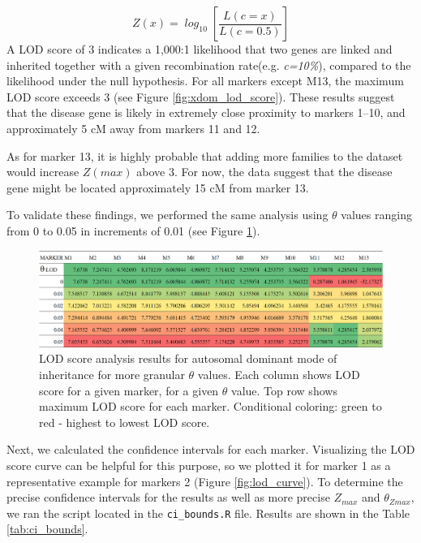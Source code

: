 \documentclass[a4paper,12pt]{article}
\begin{document}
\[
\mathit{Z(x) = \log_{10} \left[ \frac{L(c = x)}{L(c = 0.5)} \right]}
\]
A LOD score of 3 indicates a 1,000:1 likelihood that two genes are linked and inherited together with a given 
recombination rate(e.g. \textit{c=10\%}), compared to the likelihood under the null hypothesis.
For all markers except M13, the maximum LOD score exceeds 3 (see Figure \ref{fig:xdom_lod_score}).
These results suggest that the disease gene is likely in extremely close proximity to markers 1–10, 
and approximately 5 cM away from markers 11 and 12.

As for marker 13, it is highly probable that adding more families to the dataset would increase $\mathit{Z(max)}$ 
above 3. For now, the data suggest that the disease gene might be located approximately 15 cM from marker 13.

To validate these findings, we performed the same analysis using $\theta$ values ranging from 0 to 0.05 in 
increments of 0.01 (see Figure \ref{fig:xdom_LOD_score_granular}).



\begin{figure}[t] %
    \centering
    \includegraphics[width=\textwidth]{images/xdom_lod_analysis_more_granular.png}
    \caption{LOD score analysis results for autosomal dominant mode of inheritance for more 
    granular $\theta$ values. Each column shows LOD score for a given marker, for a given 
    $\theta$ value. Top row shows maximum LOD score for each marker. Conditional coloring: 
    green to red - highest to lowest LOD score.}   
    \label{fig:xdom_LOD_score_granular} 
    
\end{figure}

Next, we calculated the confidence intervals for each marker. %
Visualizing the LOD score curve can be helpful for this purpose, so we plotted it for marker 1 as 
a representative example for markers 2 (Figure \ref{fig:lod_curve}). 
To determine the precise confidence intervals for the results as well as more precise 
$\mathit{Z_{max}}$ and $\mathit{\theta_{Zmax}}$, we ran the script located in 
the \texttt{ci\_bounds.R} file. Results are shown in the Table \ref{tab:ci_bounds}.
\end{document}
